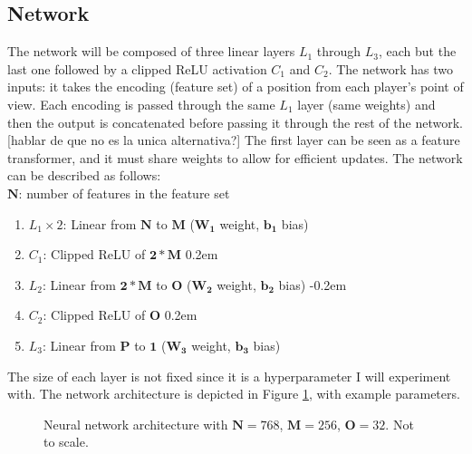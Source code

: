 \subsection{Network}

The network will be composed of three linear layers $L_1$ through $L_3$, each but the last one followed by a clipped ReLU activation $C_1$ and $C_2$. The network has two inputs: it takes the encoding (feature set) of a position from each player's point of view. Each encoding is passed through the same $L_1$ layer (same weights) and then the output is concatenated before passing it through the rest of the network. [hablar de que no es la unica alternativa?] The first layer can be seen as a feature transformer, and it must share weights to allow for efficient updates. The network can be described as follows: \\

$\bm{N}$: number of features in the feature set

\begin{enumerate}
\itemsep-0.2em
\item $L_1 \times 2$: Linear from $\bm{N}$ to $\bm{M}$ ($\bm{W_1}$ weight, $\bm{b_1}$ bias)
\item $C_1$: Clipped ReLU of $\bm{2 * M}$
\itemsep0.2em
\item $L_2$: Linear from $\bm{2 * M}$ to $\bm{O}$ ($\bm{W_2}$ weight, $\bm{b_2}$ bias)
\itemsep-0.2em
\item $C_2$: Clipped ReLU of $\bm{O}$
\itemsep0.2em
\item $L_3$: Linear from $\bm{P}$ to $\bm{1}$ ($\bm{W_3}$ weight, $\bm{b_3}$ bias)
\end{enumerate}


The size of each layer is not fixed since it is a hyperparameter I will experiment with. The network architecture is depicted in Figure \ref{fig:network}, with example parameters.

\begin{figure}[H]
\centering
{}
\caption{Neural network architecture with $\bm{N}=768$, $\bm{M}=256$, $\bm{O}=32$. Not to scale.}
\label{fig:network}
\end{figure}

